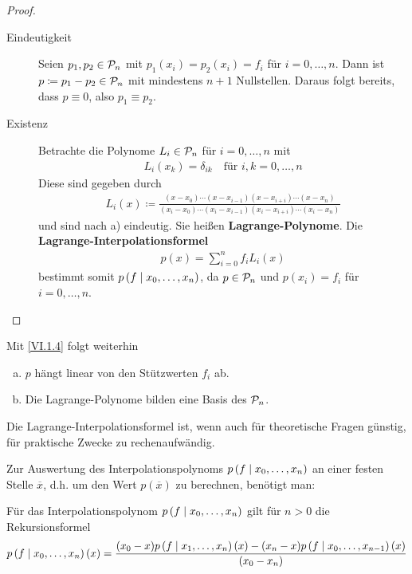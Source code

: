 \begin{proof}~
  \begin{description}
  \item[Eindeutigkeit]
    Seien $p_1, p_2\in \mathcal{P}_n$ mit $p_1(x_i)=p_2(x_i) = f_i$
    für $i=0, \dotsc, n$.
    Dann ist $p\coloneqq p_1-p_2 \in\mathcal{P}_n$
    mit mindestens $n+1$ Nullstellen.
    Daraus folgt bereits, dass $p\equiv 0$, also $p_1\equiv p_2$.

  \item[Existenz]
    Betrachte die Polynome $L_i\in\mathcal{P}_n$ für $i=0, \dotsc, n$
    mit 
    \begin{gather}
      L_i(x_k) = \delta_{ik}\quad \text{für } i,k=0, \dotsc, n 
      \label{VI.1.2}
    \end{gather}
    Diese sind gegeben durch
    \begin{gather}
      L_i(x) \coloneqq \frac{(x-x_0)\dotsm(x-x_{i-1})(x-x_{i+i})\dotsm(x-x_n)}
      {(x_i-x_0)\dotsm (x_i-x_{i-1})(x_i-x_{i+i})\dotsm (x_i-x_n)}
      \label{VI.1.3}
    \end{gather}
    und sind nach a) eindeutig.
    Sie heißen \textbf{Lagrange-Polynome}.
    Die \textbf{Lagrange-Interpolationsformel}
    \begin{gather}
      p(x) = \sum_{i=0}^{n} f_iL_i(x)
      \label{VI.1.4}
    \end{gather}
    bestimmt somit $p\left( f \mid x_0,\dotsc,x_n \right)$,
    da $p\in\mathcal{P}_n$ und $p(x_i) = f_i$ für $i=0,\dotsc, n$.
  \end{description}
\end{proof}

Mit \eqref{VI.1.4} folgt weiterhin
\begin{enumerate}[a)]
\item $p$ hängt linear von den Stützwerten $f_i$ ab.
\item Die Lagrange-Polynome bilden eine Basis des $\mathcal{P}_n$.
\end{enumerate}

Die Lagrange-Interpolationsformel ist,
wenn auch für theoretische Fragen günstig,
für praktische Zwecke zu rechenaufwändig.

Zur Auswertung des Interpolationspolynoms $p\left( f \mid x_0,\dotsc,x_n \right)$
an einer festen Stelle $\overline{x}$, d.h.
um den Wert $p(\overline{x}) $ zu berechnen,
benötigt man:

\begin{Leme}
  Für das Interpolationspolynom $p\left( f \mid x_0,\dotsc,x_n \right)$
  gilt für $n>0$ die Rekursionsformel
  \begin{gather}
    p\left( f \mid x_0,\dotsc,x_n \right)(x) = \frac{(x_0-x)p\left( f \mid x_1,\dotsc,x_n \right)(x) -
      (x_n-x)p\left( f \mid x_0,\dotsc,x_{n-1} \right)(x)}
    {(x_0-x_n)}
    \label{VI.1.5}
  \end{gather}
\end{Leme}

